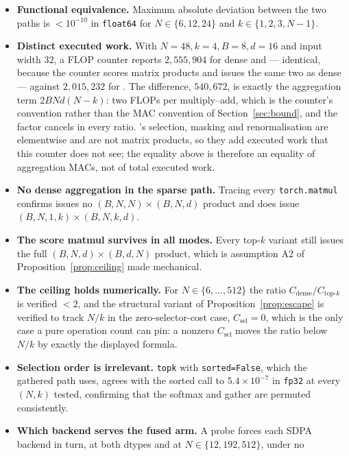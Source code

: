 \begin{itemize}
  \item \textbf{Functional equivalence.} Maximum absolute deviation between the
    two paths is $<10^{-10}$ in \texttt{float64} for
    $N \in \{6,12,24\}$ and $k \in \{1,2,3,N-1\}$.
  \item \textbf{Distinct executed work.} With
    $N{=}48, k{=}4, B{=}8, d{=}16$ and input width $32$, a FLOP counter reports
    $2{,}555{,}904$ for dense and \Mask{} --- identical, because the counter
    scores matrix products and \Mask{} issues the same two as dense --- against
    $2{,}015{,}232$ for \Gath{}. The difference, $540{,}672$, is exactly the
    aggregation term $2BNd(N-k)$: two FLOPs per multiply--add, which is the
    counter's convention rather than the MAC convention of
    Section~\ref{sec:bound}, and the factor cancels in every ratio. \Mask{}'s
    selection, masking and renormalisation are elementwise and are not matrix
    products, so they add executed work that this counter does not see; the
    equality above is therefore an equality of aggregation MACs, not of total
    executed work.
  \item \textbf{No dense aggregation in the sparse path.} Tracing every
    \texttt{torch.matmul} confirms \Gath{} issues no
    $(B,N,N)\times(B,N,d)$ product and does issue
    $(B,N,1,k)\times(B,N,k,d)$.
  \item \textbf{The score matmul survives in all modes.} Every top-$k$ variant
    still issues the full $(B,N,d)\times(B,d,N)$ product, which is
    assumption A2 of Proposition~\ref{prop:ceiling} made mechanical.
  \item \textbf{The ceiling holds numerically.} For
    $N \in \{6,\dots,512\}$ the ratio $C_\text{dense}/C_{\text{top-}k}$ is
    verified $<2$, and the structural variant of
    Proposition~\ref{prop:escape} is verified to track $N/k$ in the
    zero-selector-cost case, $C_{\mathrm{sel}} = 0$, which is the only case a
    pure operation count can pin: a nonzero $C_{\mathrm{sel}}$ moves the ratio
    below $N/k$ by exactly the displayed formula.
  \item \textbf{Selection order is irrelevant.} \texttt{topk} with
    \texttt{sorted=False}, which the gathered path uses, agrees with the
    sorted call to $5.4\times10^{-7}$ in \texttt{fp32} at every $(N,k)$ tested,
    confirming that the softmax and gather are permuted consistently.
  \item \textbf{Which backend serves the fused arm.} A probe forces each SDPA
    backend in turn, at both dtypes and at $N \in \{12,192,512\}$, under no

\end{itemize}
